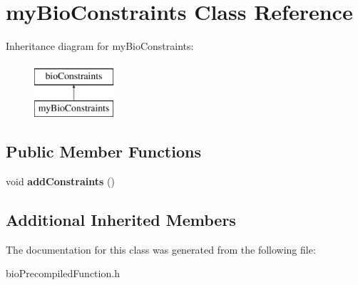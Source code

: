 \hypertarget{classmy_bio_constraints}{}\section{my\+Bio\+Constraints Class Reference}
\label{classmy_bio_constraints}
Inheritance diagram for my\+Bio\+Constraints\+:\begin{figure}[H]
\begin{center}
\leavevmode
\includegraphics[height=2.000000cm]{classmy_bio_constraints}
\end{center}
\end{figure}
\subsection*{Public Member Functions}
\begin{DoxyCompactItemize}
\item 
\mbox{\label{classmy_bio_constraints_a6cc2c5fd044a626e9d7543f0734915a0}} 
void {\bfseries add\+Constraints} ()
\end{DoxyCompactItemize}
\subsection*{Additional Inherited Members}


The documentation for this class was generated from the following file\+:\begin{DoxyCompactItemize}
\item 
bio\+Precompiled\+Function.\+h\end{DoxyCompactItemize}
